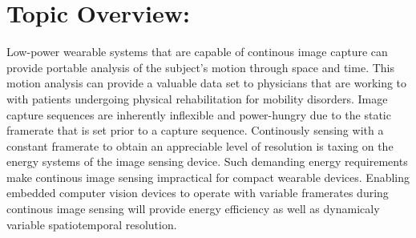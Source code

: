 \section{Topic Overview:}

\indent Low-power wearable systems that are capable of continous image capture can provide portable analysis of the subject's motion
through space and time. This motion analysis can provide a valuable data set to physicians that are working to with patients undergoing
physical rehabilitation for mobility disorders. Image capture sequences are inherently inflexible and power-hungry due to the static
framerate that is set prior to a capture sequence. Continously sensing with a constant framerate to obtain an appreciable level of
resolution is taxing on the energy systems of the image sensing device. Such demanding energy requirements make continous image sensing
impractical for compact wearable devices. Enabling embedded computer vision devices to operate with variable framerates during continous
image sensing will provide energy efficiency as well as dynamicaly variable spatiotemporal resolution.
